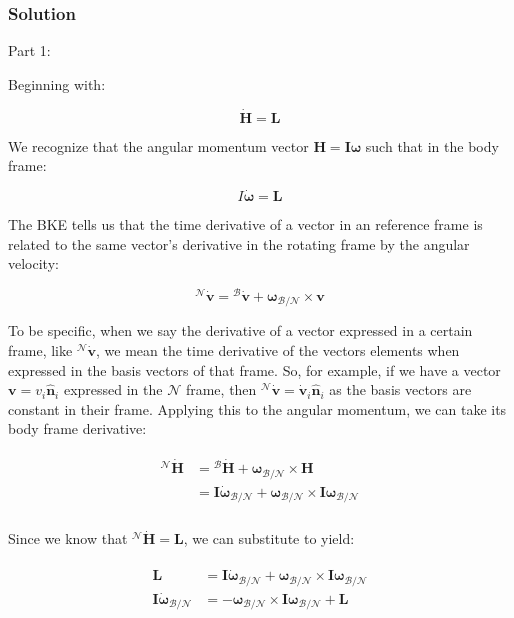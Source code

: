 \documentclass[
]{article}
\begin{document}
\subsubsection{Solution}\label{solution-1}

Part 1:

Beginning with:

\[\dot{\boldsymbol{H}} = \boldsymbol{L}\]

We recognize that the angular momentum vector
\(\boldsymbol{H} = \boldsymbol{I} \boldsymbol{\omega}\) such that in the
body frame:

\[I \dot{\boldsymbol{\omega}} = \boldsymbol{L}\]

The BKE tells us that the time derivative of a vector in an reference
frame is related to the same vector's derivative in the rotating frame
by the angular velocity:

\[{}^\mathcal{N}\dot{\boldsymbol{v}} = {}^\mathcal{B}\dot{\boldsymbol{v}} + \boldsymbol{\omega}_\mathcal{B/N} \times \boldsymbol{v}\]

To be specific, when we say the derivative of a vector expressed in a
certain frame, like \({}^\mathcal{N}\dot{\boldsymbol{v}}\), we mean the
time derivative of the vectors elements when expressed in the basis
vectors of that frame. So, for example, if we have a vector
\(\boldsymbol{v} = v_i \hat{\boldsymbol{n}}_i\) expressed in the
\(\mathcal{N}\) frame, then
\({}^\mathcal{N}\dot{\boldsymbol{v}} = \dot{\boldsymbol{v}}_i \hat{\boldsymbol{n}}_i\)
as the basis vectors are constant in their frame. Applying this to the
angular momentum, we can take its body frame derivative:

\[\begin{aligned}
\begin{aligned}
    {}^\mathcal{N}\dot{\boldsymbol{H}} &= {}^\mathcal{B}\dot{\boldsymbol{H}} + \boldsymbol{\omega}_\mathcal{B/N} \times \boldsymbol{H} \\
    &= \boldsymbol{I} \dot{\boldsymbol{\omega}}_\mathcal{B/N} + \boldsymbol{\omega}_\mathcal{B/N} \times \boldsymbol{I} \boldsymbol{\omega}_\mathcal{B/N} \\
\end{aligned}
\end{aligned}\]

Since we know that
\({}^\mathcal{N}\dot{\boldsymbol{H}} = \boldsymbol{L}\), we can
substitute to yield:

\[\begin{aligned}
\begin{aligned}
    \boldsymbol{L} &= \boldsymbol{I} \dot{\boldsymbol{\omega}}_\mathcal{B/N} + \boldsymbol{\omega}_\mathcal{B/N} \times \boldsymbol{I} \boldsymbol{\omega}_\mathcal{B/N} \\
    \boldsymbol{I} \dot{\boldsymbol{\omega}}_\mathcal{B/N} &= -\boldsymbol{\omega}_\mathcal{B/N} \times \boldsymbol{I} \boldsymbol{\omega}_\mathcal{B/N} + \boldsymbol{L} \\
\end{aligned}
\end{aligned}\]
\end{document}
